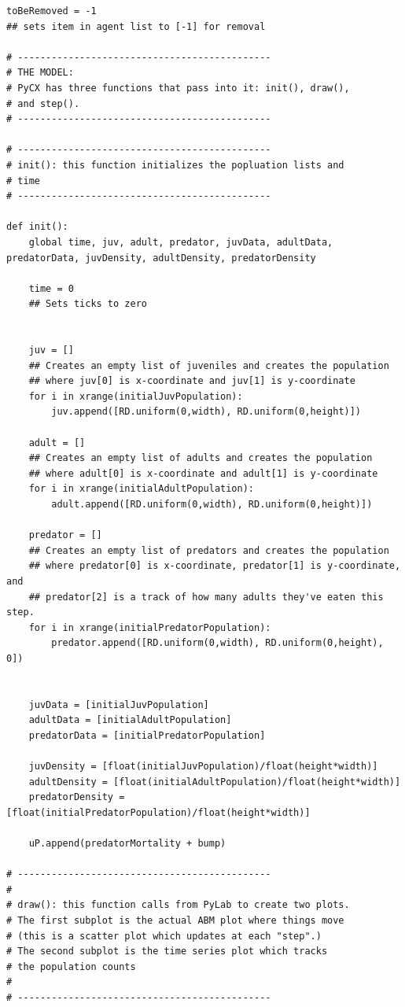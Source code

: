 \documentclass[12pt]{article}
\begin{document}
\begin{lstlisting}
toBeRemoved = -1
## sets item in agent list to [-1] for removal

# ---------------------------------------------
# THE MODEL:
# PyCX has three functions that pass into it: init(), draw(),
# and step().
# ---------------------------------------------

# ---------------------------------------------
# init(): this function initializes the popluation lists and
# time
# ---------------------------------------------

def init():
    global time, juv, adult, predator, juvData, adultData, predatorData, juvDensity, adultDensity, predatorDensity
    
    time = 0
    ## Sets ticks to zero

    
    juv = []
    ## Creates an empty list of juveniles and creates the population
    ## where juv[0] is x-coordinate and juv[1] is y-coordinate
    for i in xrange(initialJuvPopulation):
        juv.append([RD.uniform(0,width), RD.uniform(0,height)])
        
    adult = []
    ## Creates an empty list of adults and creates the population
    ## where adult[0] is x-coordinate and adult[1] is y-coordinate
    for i in xrange(initialAdultPopulation):
        adult.append([RD.uniform(0,width), RD.uniform(0,height)])

    predator = []
    ## Creates an empty list of predators and creates the population
    ## where predator[0] is x-coordinate, predator[1] is y-coordinate, and
    ## predator[2] is a track of how many adults they've eaten this step.
    for i in xrange(initialPredatorPopulation):
        predator.append([RD.uniform(0,width), RD.uniform(0,height), 0])

    
    juvData = [initialJuvPopulation]
    adultData = [initialAdultPopulation]
    predatorData = [initialPredatorPopulation]
    
    juvDensity = [float(initialJuvPopulation)/float(height*width)]
    adultDensity = [float(initialAdultPopulation)/float(height*width)]
    predatorDensity = [float(initialPredatorPopulation)/float(height*width)]    

    uP.append(predatorMortality + bump)

# ---------------------------------------------
#
# draw(): this function calls from PyLab to create two plots.
# The first subplot is the actual ABM plot where things move
# (this is a scatter plot which updates at each "step".)
# The second subplot is the time series plot which tracks
# the population counts
#
# ---------------------------------------------


\end{lstlisting}
\end{document}
